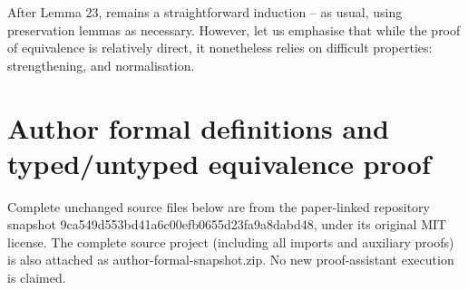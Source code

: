 \documentclass[10pt,a4paper]{amsart}
\begin{document}

 
After Lemma 23, remains a straightforward induction – as usual, using preservation lemmas as necessary. However, let us emphasise that while the proof of equivalence is relatively direct, it nonetheless relies on difficult properties: strengthening, and normalisation.\par
 
 
 

\clearpage
\section*{Author formal definitions and typed/untyped equivalence proof}
Complete unchanged source files below are from the paper-linked repository snapshot 9ca549d553bd41a6c00efb0655d23fa9a8dabd48, under its original MIT license. The complete source project (including all imports and auxiliary proofs) is also attached as author-formal-snapshot.zip. No new proof-assistant execution is claimed.
\end{document}
